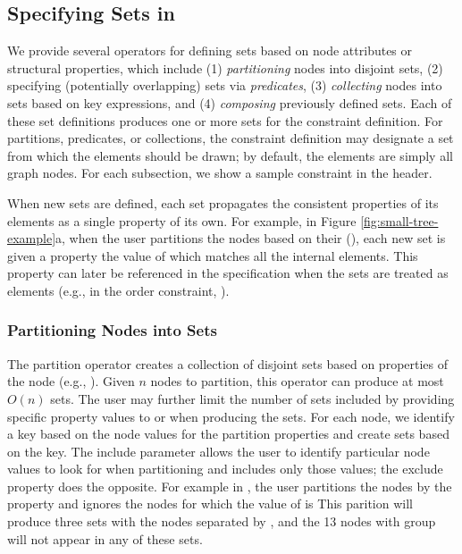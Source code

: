 \smallTreeExampleWebCoLa

\vspace{-5px}
\subsection{Specifying Sets in \projectname}
We provide several operators for defining sets based on node attributes 
or structural properties, which include (1) \emph{partitioning} nodes 
into disjoint sets, (2) specifying (potentially overlapping) sets via
\emph{predicates}, (3) \emph{collecting} nodes into sets based on key expressions,
and (4) \emph{composing} previously defined sets. Each of these set
definitions produces one or more sets for the constraint definition. For
partitions, predicates, or collections, the constraint definition may 
designate a set from which the elements should be drawn; by default, the
elements are simply all graph nodes. For each subsection, we show a sample
\projectname constraint in the header.

When new sets are defined, each set propagates the consistent properties
of its elements as a single property of its own. For example, in
Figure \ref{fig:small-tree-example}a, when the user
partitions the nodes based on their  (), 
each new set is given a  property the value of which 
matches all the internal elements. This property can later be referenced 
in the \projectname specification when the sets are treated as elements 
(e.g., in the order constraint, ).

\subsubsection{Partitioning Nodes into Sets}
The partition operator creates a collection of disjoint sets based on
properties of the node
(e.g., ).
Given $n$ nodes to partition, this operator can produce at most $O(n)$ 
sets. The user may further limit 
the number of sets included by providing specific property values to 
 or  when producing the sets.
For each node, we identify a key based on the node values for the partition
properties and create sets based on the key. The include parameter allows
the user to identify particular node values to look for when partitioning
and includes only those values; the exclude property does the opposite. 
For example in , the user
partitions the nodes by the  property and ignores the nodes
for which the value of  is  This parition 
will produce three sets with the nodes separated by , and the 
13 nodes with group  will not appear in any of these sets.

